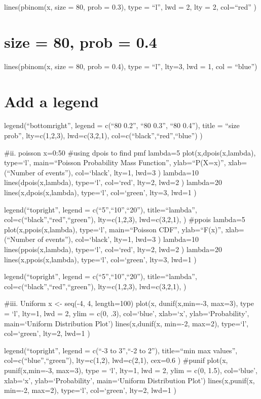\documentclass[
]{article}
\begin{document}
lines(pbinom(x, size = 80, prob = 0.3), type = ``l'', lwd = 2, lty = 2,
col=``red'' )

\hypertarget{size-80-prob-0.4-1}{%
\section{size = 80, prob = 0.4}\label{size-80-prob-0.4-1}}

lines(pbinom(x, size = 80, prob = 0.4), type = ``l'', lty=3, lwd = 1,
col = ``blue'')

\hypertarget{add-a-legend-1}{%
\section{Add a legend}\label{add-a-legend-1}}

legend(``bottomright'', legend = c(``80 0.2'', ``80 0.3'', ``80 0.4''),
title = ``size prob'', lty=c(1,2,3), lwd=c(3,2,1),
col=c(``black'',``red'',``blue'') )

\#ii. poisson x=0:50 \#using dpois to find pmf lambda=5
plot(x,dpois(x,lambda), type=`l', main=``Poisson Probability Mass
Function'', ylab=``P(X=x)'', xlab=(``Number of events''), col=`black',
lty=1, lwd=3 ) lambda=10 lines(dpois(x,lambda), type=`l', col=`red',
lty=2, lwd=2 ) lambda=20 lines(x,dpois(x,lambda), type=`l', col=`green',
lty=3, lwd=1 )

legend(``topright'', legend = c(``5'',``10'',``20''), title=``lambda'',
col=c(``black'',``red'',``green''), lty=c(1,2,3), lwd=c(3,2,1), )
\#ppois lambda=5 plot(x,ppois(x,lambda), type=`l', main=``Poisson CDF'',
ylab=``F(x)'', xlab=(``Number of events''), col=`black', lty=1, lwd=3 )
lambda=10 lines(ppois(x,lambda), type=`l', col=`red', lty=2, lwd=2 )
lambda=20 lines(x,ppois(x,lambda), type=`l', col=`green', lty=3, lwd=1 )

legend(``topright'', legend = c(``5'',``10'',``20''), title=``lambda'',
col=c(``black'',``red'',``green''), lty=c(1,2,3), lwd=c(3,2,1), )

\#iii. Uniform x \textless- seq(-4, 4, length=100) plot(x,
dunif(x,min=-3, max=3), type = `l', lty=1, lwd = 2, ylim = c(0, .3),
col=`blue', xlab=`x', ylab=`Probability', main=`Uniform Distribution
Plot') lines(x,dunif(x, min=-2, max=2), type=`l', col=`green', lty=2,
lwd=1 )

legend(``topright'', legend = c(``-3 to 3'',``-2 to 2''), title=``min
max values'', col=c(``blue'',``green''), lty=c(1,2), lwd=c(2,1), cex=0.6
) \#punif plot(x, punif(x,min=-3, max=3), type = `l', lty=1, lwd = 2,
ylim = c(0, 1.5), col=`blue', xlab=`x', ylab=`Probability',
main=`Uniform Distribution Plot') lines(x,punif(x, min=-2, max=2),
type=`l', col=`green', lty=2, lwd=1 )
\end{document}
